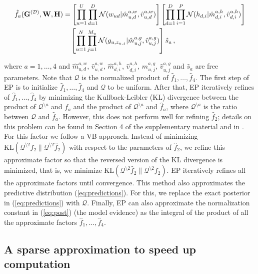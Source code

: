 \vspace{-0.65cm}
{\small
\begin{align}
\hat{f}_a(\mathbf{G}^{(\mathcal{D})},\mathbf{W},\mathbf{H}) & =
\left[\prod_{u=1}^{U}\prod_{d=1}^{D}\mathcal{N}(w_{ud}|\hat{m}_{u,d}^{a,w},\hat{v}_{u,d}^{a,w})\right]
\left[\prod_{d=1}^{D}\prod_{i=1}^{P} \mathcal{N}(h_{d,i}|\hat{m}_{d,i}^{a,h},\hat{v}_{d,i}^{a,h})\right]\notag\\
& \quad \left[\prod_{u=1}^N \prod_{j=1}^{M_u} \mathcal{N}(g_{u,z_{u,j}}|\hat{m}_{u,j}^{a,g},\hat{v}_{u,j}^{a,g})\right] \hat{s}_a\,,
\end{align}
}

\vspace{-0.5cm}
\normalsize where $a=1,\ldots,4$ and $\hat{m}_{u,d}^{a,w}$, $\hat{v}_{u,d}^{a,w}$, $\hat{m}_{d,i}^{a,h}$, $\hat{v}_{d,i}^{a,h}$,
$\hat{m}_{u,j}^{a,g}$, $\hat{v}_{u,j}^{a,g}$ and $\hat{s}_a$ are free parameters.
Note that $\mathcal{Q}$
is the normalized product of $\hat{f}_{1},\ldots,\hat{f}_{4}$.
The first step of EP is to initialize $\hat{f}_1,\ldots,\hat{f}_4$ and $\mathcal{Q}$ to be uniform.
After that, EP iteratively refines of $\hat{f}_1,\ldots,\hat{f}_4$ by minimizing the Kullback-Leibler (KL) divergence
between the product of $\mathcal{Q}^{\setminus a}$ and $f_a$
and the product of $\mathcal{Q}^{\setminus a}$ and $\hat{f}_a$, 
where $\mathcal{Q}^{\setminus a}$ is the ratio between $\mathcal{Q}$ and $\hat{f}_a$. 
However, this does not perform well for refining $\hat{f}_2$; details on this problem can
be found in Section 4 of the supplementary material and in \cite{stern2009}.
For this factor we follow a VB approach.
Instead of minimizing $\text{KL}(\mathcal{Q}^{\setminus 2} f_2 \| \mathcal{Q}^{\setminus 2} \hat{f}_2)$ with respect to the parameters of $\hat{f}_2$,
we refine this approximate factor so that the reversed version of the KL divergence is minimized, that is,
we minimize $\text{KL}(\mathcal{Q}^{\setminus 2} \hat{f}_2 \| \mathcal{Q}^{\setminus 2} f_2)$.
EP iteratively refines all the approximate factors until convergence.
This method also approximates the predictive distribution (\ref{eq:predictions}). 
For this, we replace the exact posterior in (\ref{eq:predictions})
with $\mathcal{Q}$. Finally, EP can also approximate the normalization constant in (\ref{eq:post}) (the model evidence)
as the integral of the product of all the approximate factors $\hat{f}_1,\ldots,\hat{f}_4$.

\subsection{A sparse approximation to speed up computation}


